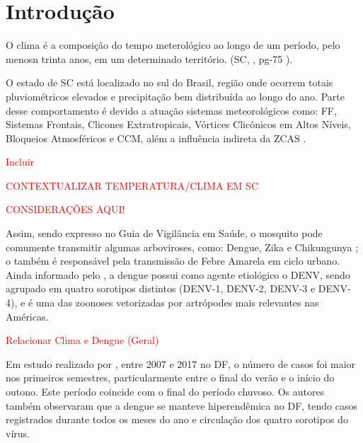 \chapter{Introdução}

\indent O clima é a composição do tempo meterológico ao longo de um período, pelo menosn trinta anos, em um determinado território. (\acrlong{SC}, \citeyear{AtlasSCnatureza}, pg-75 ).

\indent O estado de \acrfull{SC} está localizado no sul do Brasil, região onde ocorrem totais pluviométricos elevados e precipitação bem distribuída ao longo do ano. Parte desse comportamento é devido a atuação sistemas meteorológicos como: \acrfull{FF}, Sistemas Frontais, Clicones Extratropicais, Vórtices Clicônicos em Altos Níveis, Bloqueios Atmosféricos e \acrfull{CCM}, além a influência indireta da \acrfull{ZCAS} \cite{reboita2010}.

\begin{center}
\textcolor{red}{Incluir \cite{Guerra2023Regionalizacao}}
\end{center}

\textcolor{red}{CONTEXTUALIZAR TEMPERATURA/CLIMA EM SC}

\textcolor{red}{CONSIDERAÇÕES AQUI!}

\indent Assim, sendo expresso no Guia de Vigilância em Saúde, o mosquito  pode comumente transmitir algumas arboviroses, como: Dengue, Zika e Chikungunya \cite{GuiaVigSaúde22}; o  também é responsável pela transmissão de Febre Amarela em ciclo urbano. Ainda informado pelo , a dengue possui como agente etiológico o \acrfull{DENV}, sendo agrupado em quatro sorotipos distintos (\acrshort{DENV}-1, \acrshort{DENV}-2, \acrshort{DENV}-3 e \acrshort{DENV}-4), e é uma das zoonoses vetorizadas por artrópodes mais relevantes nas Américas.

\textcolor{red}{Relacionar Clima e Dengue (Geral)}

\indent Em estudo realizado por , entre 2007 e 2017 no \acrfull{DF}, o número de casos foi maior nos primeiros semestres, particularmente entre o final do verão e o início do outono. Este período  coincide com o final do período chuvoso. Os autores também observaram que a dengue se manteve hiperendêmica no \acrlong{DF}, tendo casos registrados durante todos os meses do ano e circulação dos quatro sorotipos do vírus.


